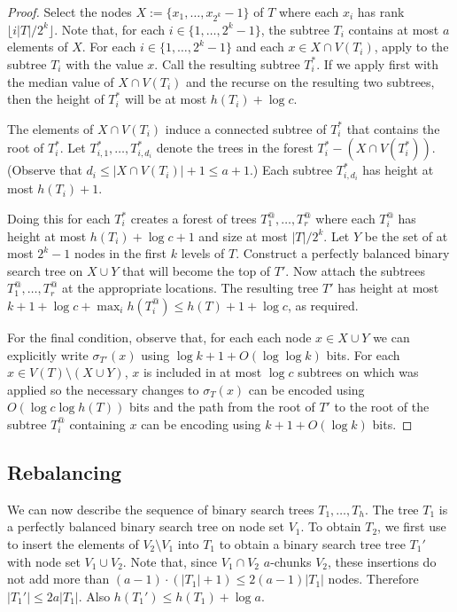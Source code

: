 \documentclass[kpfonts]{patmorin}
\begin{document}
\begin{proof}
  Select the nodes $X:=\{x_1,\ldots,x_{2^k}-1\}$ of $T$ where each $x_i$ has rank $\lfloor i|T|/2^k\rfloor$.  Note that, for each $i\in\{1,\ldots,2^k-1\}$, the subtree $T_i$ contains at most $a$ elements of $X$.  For each $i\in\{1,\ldots,2^k-1\}$ and each $x\in X\cap V(T_i)$, apply  to the subtree $T_i$ with the value $x$. Call the resulting subtree $T_i^*$.  If we apply  first with the median value of $X\cap V(T_i)$ and the recurse on the resulting two subtrees, then the height of $T_i^*$ will be at most $h(T_i)+\log c$.  
  
  The elements of $X\cap V(T_i)$ induce a connected subtree of $T_i^*$ that contains the root of $T_i^*$.  Let $T_{i,1}^*,\ldots,T_{i,d_i}^*$ denote the trees in the forest $T_i^*-(X\cap V(T^*_i))$.  (Observe that $d_i\le |X\cap V(T_i)|+1\le a+1$.)  Each subtree $T_{i,d_i}^*$ has height at most $h(T_i)+1$.
  
  Doing this for each $T_i^*$ creates a forest of trees $T^@_1,\ldots,T^@_r$ where each $T_i^@$ has height at most $h(T_i)+\log c +1$ and size at most $|T|/2^k$.  Let $Y$ be the set of at most $2^k-1$ nodes in the first $k$ levels of $T$.  Construct a perfectly balanced binary search tree on $X\cup Y$ that will become the top of $T'$.  Now attach the subtrees $T^@_1,\ldots,T^@_r$ at the appropriate locations.  The resulting tree $T'$ has height at most $k+1+\log c + \max_i h(T^@_i) \le h(T)+1+\log c$, as required.  
  
  For the final condition, observe that, for each each node $x\in X\cup Y$ we can explicitly write $\sigma_{T'}(x)$ using $\log k+1 + O(\log\log k)$ bits.  For each $x\in V(T)\setminus(X\cup Y)$, $x$ is included in at most $\log c$ subtrees on which  was applied so the necessary changes to $\sigma_T(x)$ can be encoded using $O(\log c\log h(T))$ bits and the path from the root of $T'$ to the root of the subtree $T^@_i$ containing $x$ can be encoding using $k+1+O(\log k)$ bits.
\end{proof}

\subsection{Rebalancing}

We can now describe the sequence of binary search trees $T_1,\ldots,T_h$. The tree $T_1$ is a perfectly balanced binary search tree on node set $V_1$.  To obtain $T_2$, we first use  to insert the elements of $V_2\setminus V_1$ into $T_1$ to obtain a binary search tree tree $T_1'$ with node set $V_1\cup V_2$.   Note that, since $V_1\cap V_2$ $a$-chunks $V_2$, these insertions do not add more than $(a-1)\cdot(|T_1|+1)\le 2(a-1)|T_1|$ nodes. Therefore $|T_1'|\le 2a|T_1|$.  Also $h(T_1')\le h(T_1)+\log a$.  
\end{document}
